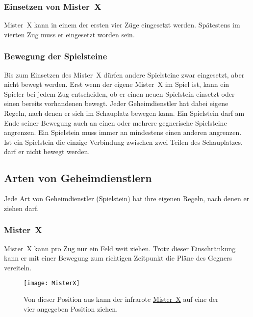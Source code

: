 \documentclass[ngerman, gray]{sdqassignment}
\begin{document}
\subsubsection{Einsetzen von Mister~X}
Mister~X kann in einem der ersten vier Züge eingesetzt werden. Spätestens im vierten Zug muss er eingesetzt worden sein.

\subsubsection{Bewegung der Spielsteine}
Bis zum Einsetzen des Mister~X dürfen andere Spielsteine zwar eingesetzt, aber nicht bewegt werden. Erst wenn der eigene Mister~X im Spiel ist, kann ein Spieler bei jedem Zug entscheiden, ob er einen neuen Spielstein einsetzt oder einen bereits vorhandenen bewegt. Jeder Geheimdienstler hat dabei eigene Regeln, nach denen er sich im Schauplatz bewegen kann. Ein Spielstein darf am Ende seiner Bewegung auch an einen oder mehrere gegnerische Spielsteine angrenzen. Ein Spielstein muss immer an mindestens einen anderen angrenzen. Ist ein Spielstein die einzige Verbindung zwischen zwei Teilen des Schauplatzes, darf er nicht bewegt werden.

\subsection{Arten von Geheimdienstlern}
Jede Art von Geheimdienstler (Spielstein) hat ihre eigenen Regeln, nach denen er ziehen darf.

\subsubsection{Mister~X}
\label{misterx}
Mister~X kann pro Zug nur ein Feld weit ziehen. Trotz dieser Einschränkung kann er mit einer Bewegung zum richtigen Zeitpunkt die Pläne des Gegners vereiteln.

\begin{figure}[ht]
    \centering
    \texttt{[image: MisterX]}
    \label{fig:misterx}
    \caption{Von dieser Position aus kann der infrarote \hyperref[misterx]{Mister~X} auf eine der vier angegeben Position ziehen.}
\end{figure}
\end{document}
